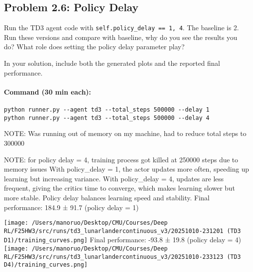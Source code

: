 \documentclass[12pt]{article}
\begin{document}
\subsection*{Problem 2.6: Policy Delay}

Run the TD3 agent code with \texttt{self.policy_delay == 1, 4}. The baseline is 2. Run these versions and compare with baseline, why do you see the results you do? What role does setting the policy delay parameter play? 

In your solution, include both the generated plots and the reported final performance.

\paragraph{Command (30 min each):}
\begin{verbatim}
python runner.py --agent td3 --total_steps 500000 --delay 1
python runner.py --agent td3 --total_steps 500000 --delay 4
\end{verbatim}

\begin{solution}[height=15cm]

NOTE: Was running out of memory on my machine, had to reduce total steps to 300000

NOTE: for policy delay = 4, training process got killed at 250000 steps due to memory issues
\newline\newline
With policy_delay = 1, the actor updates more often, speeding up learning but increasing variance. With policy_delay = 4, 
updates are less frequent, giving the critics time to converge, which makes learning slower but more stable. Policy delay 
balances learning speed and stability.
\newline\newline
Final performance: 184.9 ± 91.7 (policy delay = 1)

 \centering
    \texttt{[image: /Users/manoruo/Desktop/CMU/Courses/Deep RL/F25HW3/src/runs/td3\_lunarlandercontinuous\_v3/20251010-231201 (TD3 D1)/training\_curves.png]}
    \label{fig:td3_d1}
\newline\newline
Final performance: -93.8 ± 19.8 (policy delay = 4) 
 \centering
    \texttt{[image: /Users/manoruo/Desktop/CMU/Courses/Deep RL/F25HW3/src/runs/td3\_lunarlandercontinuous\_v3/20251010-233123 (TD3 D4)/training\_curves.png]}
    \label{fig:td3_d4}


\end{solution}
\end{document}
